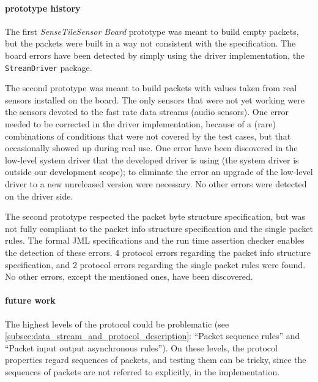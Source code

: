 \documentclass[english]{lni}
\newcommand{\lil}[1]{\texttt{\lstinline|#1|}}
\newcommand{\ST}{\emph{SenseTile}\xspace}
\newcommand{\SB}{\emph{Sensor Board}\xspace}
\newcommand{\STSB}{\ST \SB\xspace}
\begin{document}
\paragraph*{prototype history}

The first \STSB prototype was meant to build empty packets, but the packets were built in a way not consistent with the specification.  
The board errors have been detected by simply using the driver implementation, the \lil{StreamDriver} package.

The second prototype was meant to build packets with values taken from real sensors installed on the board.  
The only sensors that were not yet working were the sensors devoted to the fast rate data streams (audio sensors).  
One error needed to be corrected in the driver implementation, because of a (rare) combinations of conditions that were not covered by the test cases, but that occasionally showed up during real use.
One error have been discovered in the low-level system driver that the developed driver is using (the system driver is outside our development scope); to eliminate the error an upgrade of the low-level driver to a new unreleased version were necessary. 
No other errors were detected on the driver side.

The second prototype respected the packet byte structure specification, but was not fully compliant to the packet info structure specification and the single packet rules.
The formal JML specifications and the run time assertion checker enables the detection of these errors.
4 protocol errors regarding the packet info structure specification, and 2 protocol errors regarding the single packet rules were found. 
No other errors, except the mentioned ones, have been discovered.

\paragraph*{future work}

The highest levels of the protocol could be problematic (see \ref{subsec:data_stream_and_protocol_description}: ``Packet sequence rules'' and ``Packet input output asynchronous rules''). 
On these levels, the protocol properties regard sequences of packets, and testing them can be tricky, since the sequences of packets are not referred to explicitly, in the implementation.  
\end{document}
